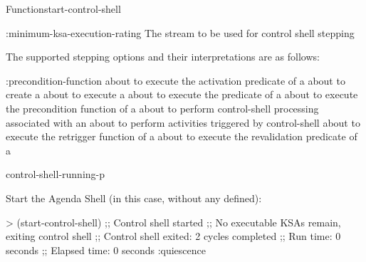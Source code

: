 \documentclass[10pt,twoside,english,pdftex]{article}
\begin{document}
\begin{functiondoc}{Function}{start-control-shell}
\begin{keywords}{:minimum-ksa-execution-rating}
   The stream to be used for control shell stepping

\end{keywords}


%
%
%
The supported stepping options and their interpretations are as follows:
\begin{keywords}{:precondition-function}
 about to execute the activation
predicate of a 
\keyword[:ks-activation] about to create a 
 about to execute a 
 about to execute the 
predicate of a 
 about to execute the precondition
function of a  
 about to perform control-shell processing
associated with an 
\keyword[:quiescence] about to perform activities triggered by 
control-shell  
 about to execute the retrigger
function of a  
 about to execute the revalidation predicate
of a  
\end{keywords}


\begin{alsos}{control-shell-running-p}
\end{alsos}

\fnexamples
Start the Agenda Shell (in this case, without any  defined):
\begin{example}
> (start-control-shell)
;; Control shell started
;; No executable KSAs remain, exiting control shell
;; Control shell exited: 2 cycles completed
;; Run time: 0 seconds
;; Elapsed time: 0 seconds
:quiescence
\end{example}


\end{functiondoc}
\end{document}
